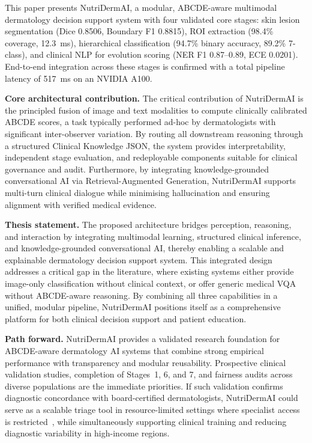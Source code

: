 \documentclass[conference]{IEEEtran}
\begin{document}
This paper presents NutriDermAI, a modular, ABCDE-aware multimodal
dermatology decision support system with four validated core stages:
skin lesion segmentation (Dice 0.8506, Boundary F1 0.8815), ROI
extraction (98.4\% coverage, 12.3~ms), hierarchical classification
(94.7\% binary accuracy, 89.2\% 7-class), and clinical NLP for
evolution scoring (NER F1 0.87--0.89, ECE 0.0201). End-to-end
integration across these stages is confirmed with a total pipeline
latency of 517~ms on an NVIDIA A100.

\textbf{Core architectural contribution.} The critical contribution of
NutriDermAI is the principled fusion of image and text modalities to
compute clinically calibrated ABCDE scores, a task typically performed
ad-hoc by dermatologists with significant inter-observer variation. By
routing all downstream reasoning through a structured Clinical Knowledge
JSON, the system provides interpretability, independent stage evaluation,
and redeployable components suitable for clinical governance and audit.
Furthermore, by integrating knowledge-grounded conversational AI via
Retrieval-Augmented Generation, NutriDermAI supports multi-turn clinical
dialogue while minimising hallucination and ensuring alignment with
verified medical evidence.

\textbf{Thesis statement.} The proposed architecture bridges perception,
reasoning, and interaction by integrating multimodal learning, structured
clinical inference, and knowledge-grounded conversational AI, thereby
enabling a scalable and explainable dermatology decision support system.
This integrated design addresses a critical gap in the literature, where
existing systems either provide image-only classification without clinical
context, or offer generic medical VQA without ABCDE-aware reasoning. By
combining all three capabilities in a unified, modular pipeline, NutriDermAI
positions itself as a comprehensive platform for both clinical decision support
and patient education.

\textbf{Path forward.} NutriDermAI provides a validated research foundation for
ABCDE-aware dermatology AI systems that combine strong empirical performance
with transparency and modular reusability. Prospective clinical validation
studies, completion of Stages~1, 6, and 7, and fairness audits across
diverse populations are the immediate priorities. If such validation
confirms diagnostic concordance with board-certified dermatologists,
NutriDermAI could serve as a scalable triage tool in resource-limited
settings where specialist access is restricted~\cite{dreremoula2022_derm_shortage},
while simultaneously supporting clinical training and reducing diagnostic
variability in high-income regions.




\end{document}
